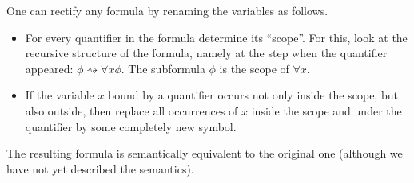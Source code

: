 

\setcounter{section}{1}
\setcounter{subsection}{2}
\setcounter{dfn}{5}


One can rectify any formula by renaming the variables as follows.
\begin{itemize}
\item
For every quantifier in the formula determine its ``scope''.
For this, look at the recursive structure of the formula,
namely at the step when the quantifier appeared: $\phi \rightsquigarrow \forall x \phi$.
The subformula $\phi$ is the scope of $\forall x$.
\item
If the variable $x$ bound by a quantifier occurs not only inside the scope,
but also outside, then replace all occurrences of $x$ inside the scope and under the quantifier by some completely new symbol.
\end{itemize}

The resulting formula is semantically equivalent to the original one (although we have not yet described the semantics).



